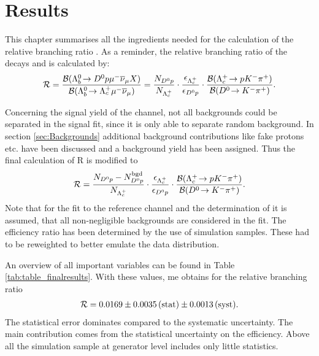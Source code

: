 \chapter{Results}
\label{sec:Results}
This chapter summarises all the ingredients needed for the calculation of the relative branching ratio \R.
As a reminder, the relative branching ratio of the decays \LbToDpmunuX and \LbToLcmunu is calculated by:
\begin{align}
	\mathcal{R} =
	\frac{{\cal B}({{\Lambda}^0_{b}}\!\rightarrow {\ensuremath{{D}^0}}{\ensuremath{p}} {\ensuremath{\mu^-}} {\ensuremath{{\overline{\nu}}_\mu}} X)}{{\cal B}({{\Lambda}^0_{b}}\!\rightarrow {\ensuremath{{\Lambda}^+_{c}}} {\ensuremath{\mu^-}}{\ensuremath{{\overline{\nu}}_\mu}})}
	 = 
	 \frac{N_{{{D}^0}{p}}}{N_{{{\Lambda}^+_{c}}}}  
	 \cdot \frac{\epsilon_{{{\Lambda}^+_{c}}}}{\epsilon_{{{D}^0}{p}}}
	 \cdot \frac{{\cal B}({{\Lambda}^+_{c}}\!\rightarrow p {{K}^-} {{\pi}^+})}{{\cal B}({{D}^0}\!\rightarrow {\ensuremath{{K}^-}}{\ensuremath{{\pi}^+}})}.
\end{align}

Concerning the signal yield \NDp of the \LbToDpmunuX channel, not all backgrounds could be separated in the signal fit, since it is only able to separate random background.
In section \ref{sec:Backgrounds} additional background contributions like fake protons etc. have been discussed and a background yield \NBgdDp has been assigned.
Thus the final calculation of R is modified to
\begin{align}
	\mathcal{R} =
	 \frac{N_{{{D}^0}{p}}-N^{\rm bgd}_{{{D}^0}{p}}}{N_{{{\Lambda}^+_{c}}}}  
	 \cdot \frac{\epsilon_{{{\Lambda}^+_{c}}}}{\epsilon_{{{D}^0}{p}}}
	 \cdot \frac{{\cal B}({{\Lambda}^+_{c}}\!\rightarrow p {{K}^-} {{\pi}^+})}{{\cal B}({{D}^0}\!\rightarrow {\ensuremath{{K}^-}}{\ensuremath{{\pi}^+}})}. \label{eq:R_mod}
\end{align}
Note that for the fit to the reference channel \LbToLcmunu and the determination of \NLc it is assumed, that all non-negligible backgrounds are considered in the fit.
The efficiency ratio \effRatio has been determined by the use of simulation samples.
These had to be reweighted to better emulate the data distribution.


An overview of all important variables can be found in Table \ref{tab:table_finalresults}.
With these values, me obtains for the relative branching ratio
\begin{align*}
    \mathcal{R} = 0.0169 \pm 0.0035\mathrm{\,(stat)} \pm 0.0013\mathrm{\,(syst)}.
\end{align*}
The statistical error dominates compared to the systematic uncertainty.
The main contribution comes from the statistical uncertainty on the efficiency.
Above all the simulation sample at generator level includes only little statistics.

